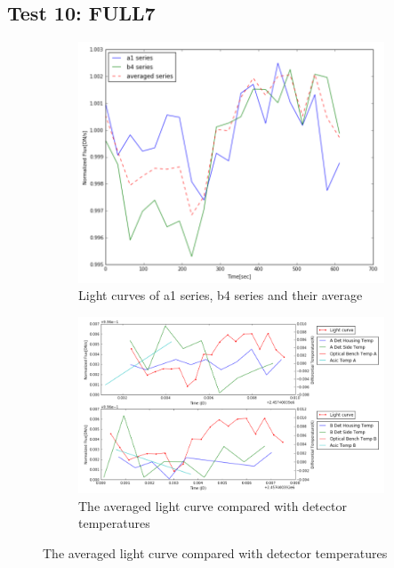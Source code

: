 \documentclass[conference]{IEEEtran}
\begin{document}
\subsection{Test 10: FULL7} 
\begin{figure}[H]
    \centering
    \begin{subfigure}{1}
        \includegraphics[scale=0.4]{ts_test10}
        \caption{Light curves of a1 series, b4 series and their average}
    \end{subfigure}

    \begin{subfigure}{2}
        \includegraphics[scale=0.4]{temp_test10}
        \caption{The averaged light curve compared with detector temperatures}
    \end{subfigure}
   

\end{figure}
\end{document}
